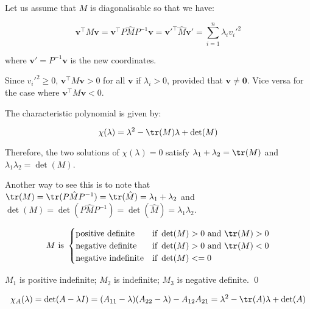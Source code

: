 \documentclass[12pt]{article}
\begin{document}

Let us assume that $M$ is diagonalisable so that we have:

\begin{equation}
    \mathbf{v}^{\intercal} M \mathbf{v} = \mathbf{v}^{\intercal} P \hat{M} P^{-1} \mathbf{v} = \mathbf{v}'^{\intercal} \hat{M} \mathbf{v}' = \sum_{i=1}^{n} \lambda_{i} v_{i}'^{2}
\end{equation}

where $\mathbf{v}' = P^{-1} \mathbf{v}$ is the new coordinates.

Since $v_{i}'^{2} \ge 0$, $\mathbf{v}^{\intercal} M \mathbf{v} > 0$ for all $\mathbf{v}$ if $\lambda_{i} > 0$, provided that $\mathbf{v} \ne \mathbf{0}$. Vice versa for the case where $\mathbf{v}^{\intercal} M \mathbf{v} < 0$.

The characteristic polynomial is given by:

\begin{equation}
    \chi(\lambda) = \lambda^{2} - \tr(M) \lambda + \det(M)
\end{equation}

Therefore, the two solutions of $\chi(\lambda) = 0$ satisfy $\lambda_{1} + \lambda_{2} = \tr(M)$ and $\lambda_{1} \lambda_{2} = \det(M)$.

Another way to see this is to note that $\tr(M) = \tr(P \hat{M} P^{-1}) = \tr(\hat{M}) = \lambda_{1} + \lambda_{2}$ and $\det(M) = \det(P \hat{M} P^{-1}) = \det(\hat{M}) = \lambda_{1} \lambda_{2}$.


\begin{equation}
    M \text{ is }
    \begin{cases}
        \text{positive definite}   & \text{if } \det(M) > 0 \text{ and } \tr(M) > 0 \\
        \text{negative definite}   & \text{if } \det(M) > 0 \text{ and } \tr(M) < 0 \\
        \text{negative indefinite} & \text{if } \det(M) <= 0
    \end{cases}
\end{equation}

$M_{1}$ is positive indefinite; $M_{2}$ is indefinite; $M_{3}$ is negative definite.
\qed




\begin{equation}
    \chi_{A}(\lambda) = \det(A - \lambda I) = (A_{11} - \lambda)(A_{22} - \lambda) - A_{12}A_{21} = \lambda^{2} - \tr(A) \lambda + \det(A)
\end{equation}
\end{document}
